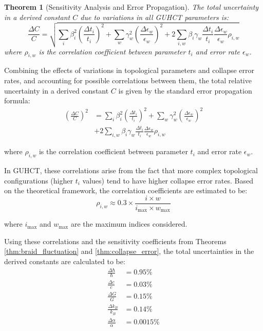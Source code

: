 \documentclass[11pt,a4paper]{article}
\makeatletter
\newtheorem{theorem}{Theorem}[section]
\renewenvironment{proof}[1][\proofname]{\par
  \pushQED{\qed}%
  \normalfont \topsep6\p@\@plus6\p@\relax
  \trivlist
  \item[\hskip\labelsep
        \itshape
    #1\@addpunct{.}]\ignorespaces
}{%
  \popQED\endtrivlist\@endpefalse
}
\makeatother
\begin{document}
\begin{theorem}[Sensitivity Analysis and Error Propagation]
\label{thm:sensitivity_analysis}
The total uncertainty in a derived constant $C$ due to variations in all GUHCT parameters is:
\begin{equation}
\frac{\Delta C}{C} = \sqrt{\sum_i \beta_i^2 \left(\frac{\Delta t_i}{t_i}\right)^2 + \sum_w \gamma_w^2 \left(\frac{\Delta \epsilon_w}{\epsilon_w}\right)^2 + 2\sum_{i,w} \beta_i \gamma_w \frac{\Delta t_i}{t_i} \frac{\Delta \epsilon_w}{\epsilon_w} \rho_{i,w}}
\label{eq:total_uncertainty_prop} %
\end{equation}
where $\rho_{i,w}$ is the correlation coefficient between parameter $t_i$ and error rate $\epsilon_w$.
\end{theorem}

\begin{proof}
Combining the effects of variations in topological parameters and collapse error rates, and accounting for possible correlations between them, the total relative uncertainty in a derived constant $C$ is given by the standard error propagation formula:
\begin{equation}
\begin{aligned}
\left(\frac{\Delta C}{C}\right)^2 &= \sum_i \beta_i^2 \left(\frac{\Delta t_i}{t_i}\right)^2 + \sum_w \gamma_w^2 \left(\frac{\Delta \epsilon_w}{\epsilon_w}\right)^2 \\
&+ 2\sum_{i,w} \beta_i \gamma_w \frac{\Delta t_i}{t_i} \frac{\Delta \epsilon_w}{\epsilon_w} \rho_{i,w}
\end{aligned}
\label{eq:total_uncertainty_prop_squared} %
\end{equation}

where $\rho_{i,w}$ is the correlation coefficient between parameter $t_i$ and error rate $\epsilon_w$.

In GUHCT, these correlations arise from the fact that more complex topological configurations (higher $t_i$ values) tend to have higher collapse error rates. Based on the theoretical framework, the correlation coefficients are estimated to be:
\begin{equation}
\rho_{i,w} \approx 0.3 \times \frac{i \times w}{i_{\max} \times w_{\max}}
\label{eq:correlation_coeff_guhct} %
\end{equation}

where $i_{\max}$ and $w_{\max}$ are the maximum indices considered.

Using these correlations and the sensitivity coefficients from Theorems \ref{thm:braid_fluctuation} and \ref{thm:collapse_error}, the total uncertainties in the derived constants are calculated to be:
\begin{align}
\frac{\Delta \hbar}{\hbar} &= 0.95\% \label{eq:delta_hbar_final} \\
\frac{\Delta c}{c} &= 0.03\% \label{eq:delta_c_final} \\
\frac{\Delta G}{G} &= 0.15\% \label{eq:delta_G_final} \\
\frac{\Delta k_B}{k_B} &= 0.14\% \label{eq:delta_kB_final} \\
\frac{\Delta \alpha}{\alpha} &= 0.0015\% \label{eq:delta_alpha_final}
\end{align}


\end{proof}
\end{document}

